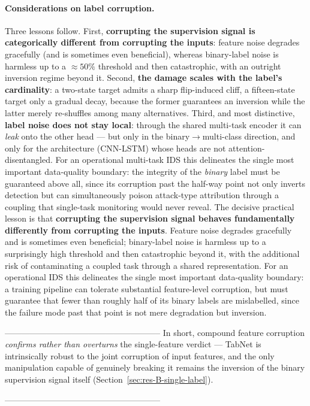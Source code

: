 \paragraph{Considerations on label corruption.}
Three lessons follow. First, \textbf{corrupting the supervision signal is categorically different from corrupting the inputs}: feature noise degrades gracefully (and is sometimes even beneficial), whereas binary-label noise is harmless up to a $\approx 50\%$ threshold and then catastrophic, with an outright inversion regime beyond it. Second, \textbf{the damage scales with the label's cardinality}: a two-state target admits a sharp flip-induced cliff, a fifteen-state target only a gradual decay, because the former guarantees an inversion while the latter merely re-shuffles among many alternatives. Third, and most distinctive, \textbf{label noise does not stay local}: through the shared multi-task encoder it can \emph{leak} onto the other head --- but only in the binary$\rightarrow$multi-class direction, and only for the architecture (CNN-LSTM) whose heads are not attention-disentangled. For an operational multi-task IDS this delineates the single most important data-quality boundary: the integrity of the \emph{binary} label must be guaranteed above all, since its corruption past the half-way point not only inverts detection but can simultaneously poison attack-type attribution through a coupling that single-task monitoring would never reveal.
The decisive practical lesson is that \textbf{corrupting the supervision signal behaves fundamentally differently from corrupting the inputs}. Feature noise degrades gracefully and is sometimes even beneficial; binary-label noise is harmless up to a surprisingly high threshold and then catastrophic beyond it, with the additional risk of contaminating a coupled task through a shared representation. For an operational IDS this delineates the single most important data-quality boundary: a training pipeline can tolerate substantial feature-level corruption, but must guarantee that fewer than roughly half of its binary labels are mislabelled, since the failure mode past that point is not mere degradation but inversion.




--------------------------------------------------------
\newline
In short, compound feature corruption \emph{confirms rather than overturns} the single-feature verdict --- TabNet is intrinsically robust to the joint corruption of input features, and the only manipulation capable of genuinely breaking it remains the inversion of the binary supervision signal itself (Section~\ref{sec:res-B-single-label}).

--------------------------------------------------------